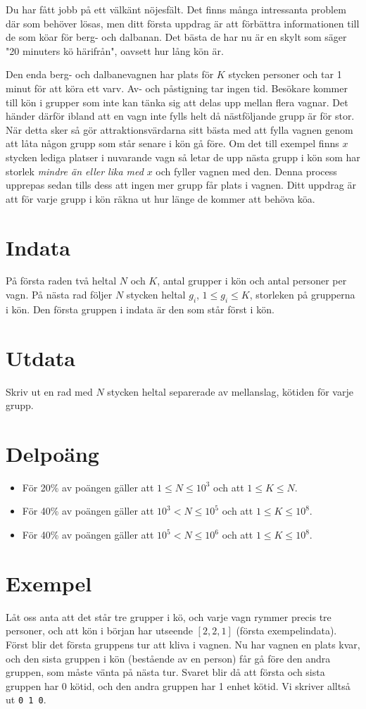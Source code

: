 Du har fått jobb på ett välkänt nöjesfält. Det finns många intressanta problem där som behöver lösas, men ditt första uppdrag är att förbättra informationen till de som köar för berg- och dalbanan. Det bästa de har nu är en skylt som säger "20 minuters kö härifrån", oavsett hur lång kön är.

Den enda berg- och dalbanevagnen har plats för $K$ stycken personer och tar 1 minut för att köra ett varv. Av- och påstigning tar ingen tid. Besökare kommer till kön i grupper som inte kan tänka sig att delas upp mellan flera vagnar. Det händer därför ibland att en vagn inte fylls helt då nästföljande grupp är för stor. När detta sker så gör attraktionsvärdarna sitt bästa med att fylla vagnen genom att låta någon grupp som står senare i kön gå före. Om det till exempel finns $x$ stycken lediga platser i nuvarande vagn så letar de upp nästa grupp i kön som har storlek \emph{mindre än eller lika med} $x$ och fyller vagnen med den. Denna process upprepas sedan tills dess att ingen mer grupp får plats i vagnen. Ditt uppdrag är att för varje grupp i kön räkna ut hur länge de kommer att behöva köa.

\section*{Indata}
På första raden två heltal $N$ och $K$, antal grupper i kön och antal personer per vagn. På nästa rad följer $N$ stycken heltal $g_i$, $1 \leq g_i \leq K$, storleken på grupperna i kön. Den första gruppen i indata är den som står först i kön.

\section*{Utdata}
Skriv ut en rad med $N$ stycken heltal separerade av mellanslag, kötiden för varje grupp.

\section*{Delpoäng}
\begin{itemize}
\item För 20\% av poängen gäller att $1 \leq N \leq 10^3$ och att $1 \leq K \leq N$.
\item För 40\% av poängen gäller att $10^3 < N \leq 10^{5}$ och att $1 \leq K \leq 10^8$.
\item För 40\% av poängen gäller att $10^5 < N \leq 10^6$ och att $1 \leq K \leq 10^8$.
\end{itemize}

\section*{Exempel}
Låt oss anta att det står tre grupper i kö, och varje vagn rymmer precis tre personer, och att kön i början har utseende $[2,2,1]$ (första exempelindata). Först blir det första gruppens tur att kliva i vagnen. Nu har vagnen en plats kvar, och den sista gruppen i kön (bestående av en person) får gå före den andra gruppen, som måste vänta på nästa tur. Svaret blir då att första och sista gruppen har 0 kötid, och den andra gruppen har 1 enhet kötid. Vi skriver alltså ut \texttt{0 1 0}.
